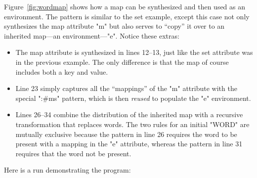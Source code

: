 \documentclass[11pt]{article} %
\begin{document}
\begin{example}\label{ex:wordmap}
  Figure~\ref{fig:wordmap} shows how a map can be synthesized and then used as an environment. The
  pattern is similar to the set example, except this case not only synthesizes the map attribute "m"
  but also serves to ``copy'' it over to an inherited map---an environment---"e". Notice these
  extras:
  \begin{itemize}

  \item The map attribute is synthesized in lines 12--13, just like the set attribute was in the
    previous example. The only difference is that the map of course includes both a key and value.

  \item Line 23 simply captures all the ``mappings'' of the "m" attribute with the special
    ":#ms" pattern, which is then \emph{reused} to populate the "e" environment.

  \item Lines 26--34 combine the distribution of the inherited map with a recursive transformation
    that replaces words. The two rules for an initial "WORD" are mutually exclusive because the
    pattern in line 26 requires the word to be present with a mapping in the "e" attribute, whereas
    the pattern in line 31 requires that the word not be present.

  \end{itemize}
  Here is a run demonstrating the program:
\end{example}
\end{document}
